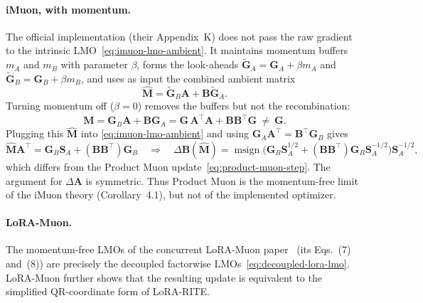 \documentclass[11pt]{article}
\newcommand{\mat}[1]{\bm{#1}}
\DeclareMathOperator{\msign}{msign}          %
\begin{document}
\paragraph{iMuon, with momentum.} The official implementation (their Appendix~K) does not pass the raw gradient to the intrinsic LMO~\eqref{eq:imuon-lmo-ambient}. It maintains momentum buffers $m_A$ and $m_B$ with parameter $\beta$, forms the look-aheads $\widetilde{\mat{G}}_A=\mat{G}_A+\beta m_A$ and $\widetilde{\mat{G}}_B=\mat{G}_B+\beta m_B$, and uses as input the combined ambient matrix
\begin{equation*}
  \widehat{\mat{M}}=\widetilde{\mat{G}}_B \mat{A}+\mat{B}\widetilde{\mat{G}}_A .
\end{equation*}
Turning momentum off ($\beta=0$) removes the buffers but not the recombination:
\begin{equation*}
  \widehat{\mat{M}}=\mat{G}_B \mat{A}+\mat{B} \mat{G}_A=\mat{G}\,\mat{A}^\top \mat{A}+\mat{B}\mat{B}^\top \mat{G}\ \neq\ \mat{G} .
\end{equation*}
Plugging this $\widehat{\mat{M}}$ into \eqref{eq:imuon-lmo-ambient} and using $\mat{G}_A \mat{A}^\top=\mat{B}^\top \mat{G}_B$ gives
\begin{equation}\label{eq:imuon-implemented}
  \widehat{\mat{M}} \mat{A}^\top=\mat{G}_B \mat{S}_A+(\mat{B}\mat{B}^\top)\mat{G}_B
  \quad\Longrightarrow\quad
  \Delta\mat{B}(\widehat{\mat{M}})=\msign\!\big(\mat{G}_B \mat{S}_A^{1/2}+(\mat{B}\mat{B}^\top)\mat{G}_B \mat{S}_A^{-1/2}\big)\mat{S}_A^{-1/2},
\end{equation}
which differs from the Product Muon update~\eqref{eq:product-muon-step}. The argument for $\Delta\mat{A}$ is symmetric. Thus Product Muon is the momentum-free limit of the iMuon theory (Corollary~4.1), but not of the implemented optimizer.


\paragraph{LoRA-Muon.}
The momentum-free LMOs of the concurrent LoRA-Muon paper~\cite{loramuon} (its Eqs.~(7) and~(8)) are precisely the decoupled factorwise LMOs~\eqref{eq:decoupled-lora-lmo}. LoRA-Muon further shows that the resulting update is equivalent to the simplified QR-coordinate form of LoRA-RITE.
\end{document}
